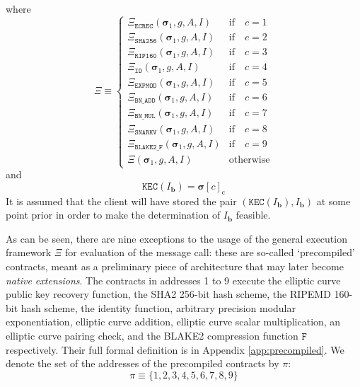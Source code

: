 \documentclass[9pt,oneside]{amsart}
\begin{document}
\begin{multicols}{2}
\begin{eqnarray}
\end{eqnarray}
\nopagebreak[1]where
\begin{equation}
\Xi \equiv \begin{cases}
\Xi_{\mathtt{ECREC}}    (\boldsymbol{\sigma}_1, g, A, I) & \text{if} \quad c = 1 \\
\Xi_{\mathtt{SHA256}}   (\boldsymbol{\sigma}_1, g, A, I) & \text{if} \quad c = 2 \\
\Xi_{\mathtt{RIP160}}   (\boldsymbol{\sigma}_1, g, A, I) & \text{if} \quad c = 3 \\
\Xi_{\mathtt{ID}}       (\boldsymbol{\sigma}_1, g, A, I) & \text{if} \quad c = 4 \\
\Xi_{\mathtt{EXPMOD}}   (\boldsymbol{\sigma}_1, g, A, I) & \text{if} \quad c = 5 \\
\Xi_{\mathtt{BN\_ADD}}  (\boldsymbol{\sigma}_1, g, A, I) & \text{if} \quad c = 6 \\
\Xi_{\mathtt{BN\_MUL}}  (\boldsymbol{\sigma}_1, g, A, I) & \text{if} \quad c = 7 \\
\Xi_{\mathtt{SNARKV}}   (\boldsymbol{\sigma}_1, g, A, I) & \text{if} \quad c = 8 \\
\Xi_{\mathtt{BLAKE2\_F}}(\boldsymbol{\sigma}_1, g, A, I) & \text{if} \quad c = 9 \\
\Xi                     (\boldsymbol{\sigma}_1, g, A, I) & \text{otherwise} \end{cases}
\end{equation}
and
\begin{equation}
\mathtt{KEC}(I_{\mathbf{b}}) = \boldsymbol{\sigma}[c]_{\mathrm{c}}
\end{equation}
It is assumed that the client will have stored the pair $(\mathtt{KEC}(I_{\mathbf{b}}), I_{\mathbf{b}})$ at some point prior in order to make the determination of $I_{\mathbf{b}}$ feasible.

As can be seen, there are nine exceptions to the usage of the general execution framework $\Xi$ for evaluation of the message call: these are so-called `precompiled' contracts, meant as a preliminary piece of architecture that may later become \textit{native extensions}.
The contracts in addresses 1 to 9 execute the elliptic curve public key recovery function, the SHA2 256-bit hash scheme, the RIPEMD 160-bit hash scheme, the identity function, arbitrary precision modular exponentiation, elliptic curve addition, elliptic curve scalar multiplication, an elliptic curve pairing check, and the BLAKE2 compression function $\mathtt{F}$ respectively.
Their full formal definition is in Appendix \ref{app:precompiled}.
\hypertarget{precompiled_set}{}We denote the set of the addresses of the precompiled contracts by $\pi$:
\begin{equation}
\pi \equiv \{1, 2, 3, 4, 5, 6, 7, 8, 9 \}
\end{equation}


\end{multicols}
\end{document}
